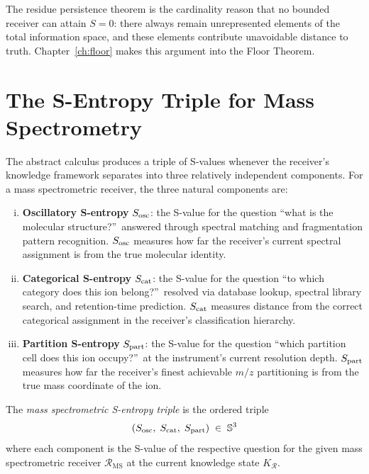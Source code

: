 The residue persistence theorem is the cardinality reason that no bounded
receiver can attain $S = 0$: there always remain unrepresented elements of
the total information space, and these elements contribute unavoidable distance
to truth.  Chapter~\ref{ch:floor} makes this argument into the Floor Theorem.

\section{The S-Entropy Triple for Mass Spectrometry}
\label{sec:ch13-triple}

The abstract calculus produces a triple of S-values whenever the receiver's
knowledge framework separates into three relatively independent components.
For a mass spectrometric receiver, the three natural components are:

\begin{enumerate}[(i)]
  \item \textbf{Oscillatory S-entropy} $S_{\mathrm{osc}}$: the S-value for the question
    ``what is the molecular structure?''\ answered through spectral matching
    and fragmentation pattern recognition.  $S_{\mathrm{osc}}$ measures how far the
    receiver's current spectral assignment is from the true molecular identity.

  \item \textbf{Categorical S-entropy} $S_{\mathrm{cat}}$: the S-value for the question
    ``to which category does this ion belong?''\ resolved via database lookup,
    spectral library search, and retention-time prediction.  $S_{\mathrm{cat}}$ measures
    distance from the correct categorical assignment in the receiver's
    classification hierarchy.

  \item \textbf{Partition S-entropy} $S_{\mathrm{part}}$: the S-value for the question
    ``which partition cell does this ion occupy?''\ at the instrument's current
    resolution depth.  $S_{\mathrm{part}}$ measures how far the receiver's finest achievable
    $m/z$ partitioning is from the true mass coordinate of the ion.
\end{enumerate}

\begin{definition}\label{def:ms-triple}
The \emph{mass spectrometric S-entropy triple} is the ordered triple
\[
  (S_{\mathrm{osc}},\; S_{\mathrm{cat}},\; S_{\mathrm{part}})
  \;\in\; \mathbb{S}^3
\]
where each component is the S-value of the respective question for the given
mass spectrometric receiver $\mathcal{R}_{\mathrm{MS}}$ at the current
knowledge state $K_{\mathcal{R}}$.
\end{definition}

